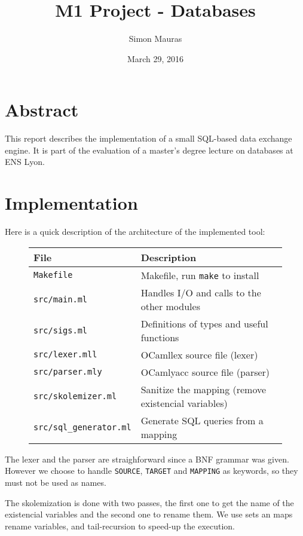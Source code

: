 \documentclass[a4paper, 11pt]{article}
\title{M1 Project - Databases}
\author{Simon Mauras}
\date{March 29,  2016}
\begin{document}
\maketitle

\section*{Abstract}

This report describes the implementation of a small SQL-based data exchange engine. It is part of the evaluation of a master's degree lecture on databases at ENS Lyon.

\section{Implementation}

Here is a quick description of the architecture of the implemented tool:
\begin{figure}[h!]
\centering
\begin{tabular}{ll}
File & Description \\
\hline
\verb|Makefile| & Makefile, run \verb|make| to install\\
\verb|src/main.ml| & Handles I/O and calls to the other modules\\
\verb|src/sigs.ml| & Definitions of types and useful functions\\
\verb|src/lexer.mll| & OCamllex source file (lexer)\\
\verb|src/parser.mly| & OCamlyacc source file (parser)\\
\verb|src/skolemizer.ml| & Sanitize the mapping (remove existencial variables)\\
\verb|src/sql_generator.ml| & Generate SQL queries from a mapping\\
\end{tabular}
\end{figure}

The lexer and the parser are straighforward since a BNF grammar was given. However we choose to handle \verb|SOURCE|, \verb|TARGET| and \verb|MAPPING| as keywords, so they must not be used as names.

\bigskip

The skolemization is done with two passes, the first one to get the name of the existencial variables and the second one to rename them. We use sets an maps rename variables, and tail-recursion to speed-up the execution.

\bigskip
\end{document}
